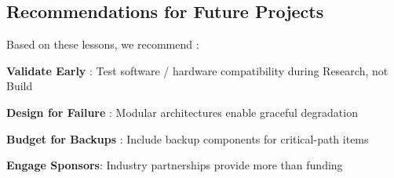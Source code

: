 \subsection {Recommendations for Future Projects
}

Based on these lessons, we recommend :

\begin {
  enumerate
}
\item \textbf{Validate Early} : Test software /
                                hardware compatibility during Research,
    not Build
    \item \textbf {Design for Failure
}: Modular architectures enable graceful degradation
    \item \textbf{Budget for Backups
}: Include backup components for critical-path items
    \item \textbf{Engage Sponsors}: Industry partnerships provide more than funding
\end{
  enumerate
}
